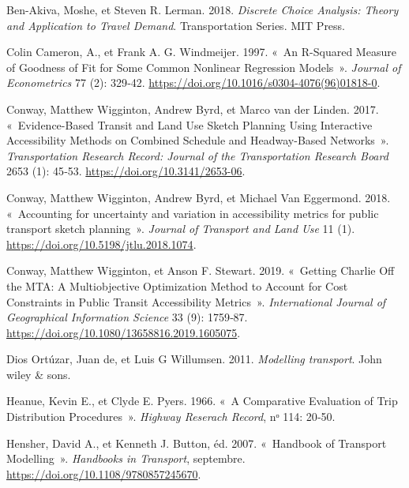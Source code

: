 \documentclass[
  10pt,
  a4paper,
  numbers=noendperiod,
  DIV=12]{scrartcl}
\newlength{\cslhangindent}
\newlength{\cslentryspacingunit} %
\newenvironment{CSLReferences}[2] %
 {%
  \setlength{\parindent}{0pt}
  \ifodd #1
  \let\oldpar\par
  \def\par{\hangindent=\cslhangindent\oldpar}
  \fi
  \setlength{\parskip}{#2\cslentryspacingunit}
 }%
 {}
\begin{document}
\hypertarget{refs}{}
\begin{CSLReferences}{1}{0}
\leavevmode{}%
Ben-Akiva, Moshe, et Steven R. Lerman. 2018. \emph{Discrete Choice
Analysis: Theory and Application to Travel Demand}. Transportation
Series. MIT Press.

\leavevmode{}%
Colin Cameron, A., et Frank A. G. Windmeijer. 1997. {«~An R-Squared
Measure of Goodness of Fit for Some Common Nonlinear Regression
Models~»}. \emph{Journal of Econometrics} 77 (2): 329‑42.
\url{https://doi.org/10.1016/s0304-4076(96)01818-0}.

\leavevmode{}%
Conway, Matthew Wigginton, Andrew Byrd, et Marco van der Linden. 2017.
{«~Evidence-Based Transit and Land Use Sketch Planning Using Interactive
Accessibility Methods on Combined Schedule and Headway-Based
Networks~»}. \emph{Transportation Research Record: Journal of the
Transportation Research Board} 2653 (1): 45‑53.
\url{https://doi.org/10.3141/2653-06}.

\leavevmode{}%
Conway, Matthew Wigginton, Andrew Byrd, et Michael Van Eggermond. 2018.
{«~Accounting for uncertainty and variation in accessibility metrics for
public transport sketch planning~»}. \emph{Journal of Transport and Land
Use} 11 (1). \url{https://doi.org/10.5198/jtlu.2018.1074}.

\leavevmode{}%
Conway, Matthew Wigginton, et Anson F. Stewart. 2019. {«~Getting Charlie
Off the MTA: A Multiobjective Optimization Method to Account for Cost
Constraints in Public Transit Accessibility Metrics~»}.
\emph{International Journal of Geographical Information Science} 33 (9):
1759‑87. \url{https://doi.org/10.1080/13658816.2019.1605075}.

\leavevmode{}%
Dios Ortúzar, Juan de, et Luis G Willumsen. 2011. \emph{Modelling
transport}. John wiley \& sons.

\leavevmode{}%
Heanue, Kevin E., et Clyde E. Pyers. 1966. {«~A Comparative Evaluation
of Trip Distribution Procedures~»}. \emph{Highway Reserach Record}, nᵒ
114: 20‑50.

\leavevmode{}%
Hensher, David A., et Kenneth J. Button, éd. 2007. {«~Handbook of
Transport Modelling~»}. \emph{Handbooks in Transport}, septembre.
\url{https://doi.org/10.1108/9780857245670}.


\end{CSLReferences}
\end{document}
